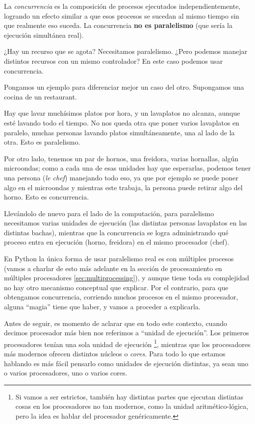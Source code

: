La \textit{concurrencia} es la composición de procesos ejecutados independientemente, logrando un efecto similar a que esos procesos se sucedan al mismo tiempo sin que realmente eso suceda. La concurrencia \textbf{no es paralelismo} (que sería la ejecución simultánea real).

¿Hay un recurso que se agota? Necesitamos paralelismo. ¿Pero podemos manejar distintos recursos con un mismo controlador? En este caso podemos usar concurrencia.

Pongamos un ejemplo para diferenciar mejor un caso del otro. Supongamos una cocina de un restaurant. 

Hay que lavar muchísimos platos por hora, y un lavaplatos no alcanza, aunque esté lavando todo el tiempo. No nos queda otra que poner varios lavaplatos en paralelo, muchas personas lavando platos simultáneamente, una al lado de la otra. Esto es paralelismo.

Por otro lado, tenemos un par de hornos, una freidora, varias hornallas, algún microondas; como a cada una de esas unidades hay que esperarlas, podemos tener una persona (\textit{le chef}) manejando todo eso, ya que por ejemplo se puede poner algo en el microondas y mientras este trabaja, la persona puede retirar algo del horno. Esto es concurrencia.

Llevándolo de nuevo para el lado de la computación, para paralelismo necesitamos varias unidades de ejecución (las distintas personas lavaplatos en las distintas bachas), mientras que la concurrencia se logra administrando qué proceso entra en ejecución (horno, freidora) en el mismo procesador (chef).

En Python la única forma de usar paralelismo real es con múltiples procesos (vamos a charlar de esto más adelante en la sección de procesamiento en múltiples procesadores \ref{sec:multiprocessing}), y aunque tiene toda su complejidad no hay otro mecanismo conceptual que explicar. Por el contrario, para que obtengamos concurrencia, corriendo muchos procesos en el mismo procesador, alguna ``magia'' tiene que haber, y vamos a proceder a explicarla.

\begin{info}
Antes de seguir, es momento de aclarar que en todo este contexto, cuando decimos procesador más bien nos referimos a ``unidad de ejecución''. Los primeros procesadores tenían una sola unidad de ejecución \footnote{Si vamos a ser estrictos, también hay distintas partes que ejecutan distintas cosas en los procesadores no tan modernos, como la unidad aritmético-lógica, pero la idea es hablar del procesador genéricamente.}, mientras que los procesadores más modernos ofrecen distintos núcleos o \textit{cores}. Para todo lo que estamos hablando es más fácil pensarlo como unidades de ejecución distintas, ya sean uno o varios procesadores, uno o varios cores.
\end{info}

